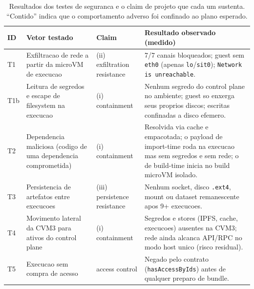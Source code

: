 
\begin{table}[t]
\centering
\caption{Resultados dos testes de seguranca e o claim de projeto que cada um sustenta. ``Contido'' indica que o comportamento adverso foi confinado ao plano esperado.}
\label{tab:security-results}
\footnotesize
\begin{tabularx}{\textwidth}{@{}p{0.8cm}p{3.2cm}p{2.0cm}X@{}}
\toprule
ID & Vetor testado & Claim & Resultado observado (medido) \\
\midrule
T1 & Exfiltracao de rede a partir da microVM de execucao & (ii) exfiltration resistance & 7/7 canais bloqueados; guest sem \texttt{eth0} (apenas \texttt{lo}/\texttt{sit0}); \texttt{Network is unreachable}. \\
\addlinespace
T1b & Leitura de segredos e escape de filesystem na execucao & (i) containment & Nenhum segredo do control plane no ambiente; guest so enxerga seus proprios discos; escritas confinadas a disco efemero. \\
\addlinespace
T2 & Dependencia maliciosa (codigo de uma dependencia comprometida) & (i) containment & Resolvida via cache e empacotada; o payload de import-time roda na execucao mas sem segredos e sem rede; o de build-time inicia no build microVM isolado. \\
\addlinespace
T3 & Persistencia de artefatos entre execucoes & (iii) persistence resistance & Nenhum socket, disco \texttt{.ext4}, mount ou dataset remanescente apos 9+ execucoes. \\
\addlinespace
T4 & Movimento lateral da CVM3 para ativos do control plane & (i) containment & Segredos e stores (IPFS, cache, execucoes) ausentes na CVM3; rede ainda alcanca API/RPC no modo host unico (risco residual). \\
\addlinespace
T5 & Execucao sem compra de acesso & access control & Negado pelo contrato (\texttt{hasAccessByIds}) antes de qualquer preparo de bundle. \\
\bottomrule
\end{tabularx}
\end{table}

